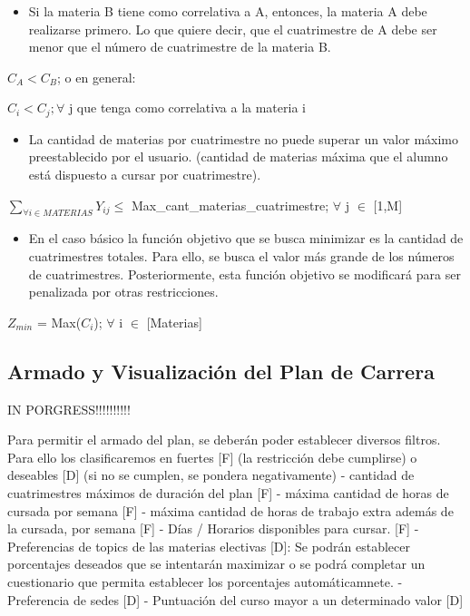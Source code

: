 \documentclass[a4paper]{article}
\begin{document}
\begin{itemize}
	\item Si la materia B tiene como correlativa a A, entonces, la materia A debe realizarse primero. Lo que quiere decir, que el cuatrimestre de A debe ser menor que el número de cuatrimestre de la materia B. 
\end{itemize}

$C_{A} < C_{B}$; o en general:

$C_{i} < C_{j};  \forall$ j que tenga como correlativa a la materia i

\begin{itemize}
	\item La cantidad de materias por cuatrimestre no puede superar un valor máximo preestablecido por el usuario. (cantidad de materias máxima que el alumno está dispuesto a cursar por cuatrimestre).
\end{itemize}

$\sum_{\forall i \in MATERIAS} Y_{ij} \leq$ Max\_cant\_materias\_cuatrimestre;  $\forall$ j $\in$ [1,M]

\begin{itemize}
	\item En el caso básico la función objetivo que se busca minimizar es la cantidad de cuatrimestres totales. Para ello, se busca el valor más grande de los números de cuatrimestres. Posteriormente, esta función objetivo se modificará para ser penalizada por otras restricciones.
\end{itemize}

$Z_{min}$ = Max($C_{i}$);  $\forall$ i $\in$ [Materias]

\subsection{Armado y Visualización del Plan de Carrera}

IN PORGRESS!!!!!!!!!!

Para permitir el armado del plan, se deberán poder establecer diversos filtros. Para ello los clasificaremos en fuertes [F] (la restricción debe cumplirse) o deseables [D] (si no se cumplen, se pondera negativamente)
- cantidad de cuatrimestres máximos de duración del plan [F]
- máxima cantidad de horas de cursada por semana [F]
- máxima cantidad de horas de trabajo extra además de la cursada, por semana [F]
- Días / Horarios disponibles para cursar. [F]
- Preferencias de topics de las materias electivas [D]: Se podrán establecer porcentajes deseados que se intentarán maximizar o se podrá completar un cuestionario que permita establecer los porcentajes automáticamnete.
- Preferencia de sedes [D]
- Puntuación del curso mayor a un determinado valor [D]
\end{document}
